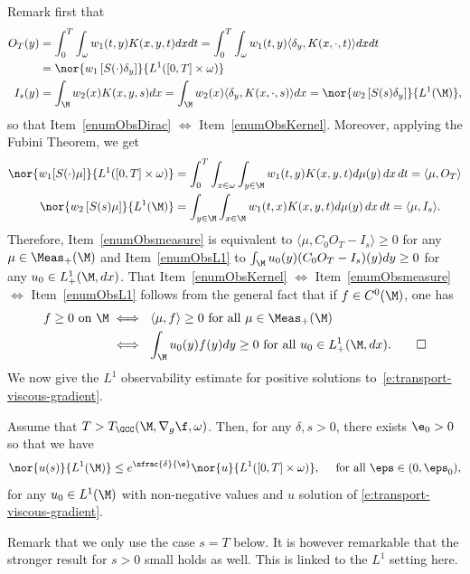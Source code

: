 \bnp
Remark first that
\begin{align*}
O_T(y)& =\int_0^T \int_{\omega} w_1(t,y)K(x,y,t)dx dt = \int_0^T \int_{\omega} w_1(t,y)\langle \delta_y, K(x,\cdot,t ) \rangle dx dt \\
& = \nor{w_1 \left[S(\cdot) \delta_y \right]}{L^1([0,T]\times \omega)}\\
I_s (y)& =\int_{\M} w_2(x)K(x,y, s)dx = \int_{\M}w_2(x)\langle \delta_y, K(x,\cdot,s)\rangle dx = \nor{w_2 \left[S(s) \delta_y \right]}{L^1(\M)},
\end{align*}
so that Item~\eqref{enumObsDirac} $\Leftrightarrow$ Item~\eqref{enumObsKernel}. Moreover, applying the Fubini Theorem, we get
\begin{align*}
\nor{w_1 [S(\cdot)\mu]}{L^1([0,T]\times \omega)} &=\int_0^T \int_{x\in \omega}\int_{y\in \M} w_1(t,y)K(x,y,t)d\mu(y)\,dx\,dt=\langle \mu, O_T \rangle\\
\nor{w_2 \left[S(s)\mu\right]}{L^1(\M)}&=\int_{y\in \M}\int_{x\in \M} w_1(t,x)K(x,y,t)d\mu(y)\,dx\,dt=\langle \mu, I_s \rangle.
\end{align*}
Therefore, Item~\eqref{enumObsmeasure} is equivalent to $\langle \mu, C_0O_T-I_s \rangle \geq 0$ for any $\mu \in \Meas_+(\M)$ and Item~\eqref{enumObsL1} to $\int_\M u_0(y) (C_0O_T-I_s )(y) dy \geq 0$ for any $u_0 \in L^1_+(\M,dx)$. That Item~\eqref{enumObsKernel} $\Leftrightarrow$ Item~\eqref{enumObsmeasure} $\Leftrightarrow$ Item~\eqref{enumObsL1} follows from the general fact that if $f \in C^0(\M)$, one has
\begin{align*}
f \geq 0 \text{ on }\M & \iff \ \langle \mu, f \rangle \geq 0 \text{ for all }\mu \in \Meas_+(\M) \\
& \iff \ \int_\M u_0(y) f(y) dy \geq 0\text{ for all }u_0 \in L^1_+(\M,dx).\qedhere
\end{align*}
\enp
We now give the $L^1$ observability estimate for positive solutions to~\eqref{e:transport-viscous-gradient}.
\begin{proposition}
\label{propobsL1}
Assume that $T>T_{\GCC}(\M, \nabla_g\f,\omega)$. Then, for any $\delta, s >0$, there exists $\e_0>0$ so that we have
\begin{equation}
\label{estimL1+}
\nor{u(s)}{L^1(\M)}\leq e^{\sfrac{\delta}{\e}}\nor{u}{L^1([0,T]\times \omega)}, \quad \text{ for all } \eps \in (0,\eps_0),
\end{equation}
for any $u_0\in L^1(\M)$ with non-negative values and $u$ solution of \eqref{e:transport-viscous-gradient}.
\end{proposition}
Remark that we only use the case $s=T$ below. It is however remarkable that the stronger result for $s >0$ small holds as well. This is linked to the $L^1$ setting here.
